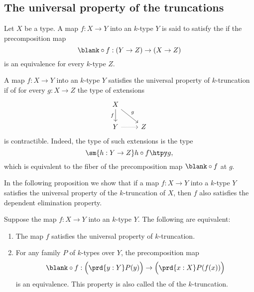 \subsection{The universal property of the truncations}

\begin{defn}\label{defn:is_truncation}
Let $X$ be a type. A map $f:X\to Y$ into an $k$-type $Y$ is said to satisfy the  if the precomposition map
\begin{equation*}
\blank\circ f: (Y\to Z)\to (X\to Z)
\end{equation*}
is an equivalence for every $k$-type $Z$.
\end{defn}

\begin{rmk}
A map $f:X\to Y$ into an $k$-type $Y$ satisfies the universal property of $k$-truncation if of for every $g:X\to Z$ the type of extensions
\begin{equation*}
\begin{tikzcd}
X \arrow[dr,"g"] \arrow[d,swap,"f"] \\
Y \arrow[r,densely dotted] & Z
\end{tikzcd}
\end{equation*}
is contractible. Indeed, the type of such extensions is the type
\begin{equation*}
\sm{h:Y\to Z} h\circ f\htpy g,
\end{equation*}
which is equivalent to the fiber of the precomposition map $\blank\circ f$ at $g$. 
\end{rmk}

In the following proposition we show that if a map $f:X\to Y$ into a $k$-type $Y$ satisfies the universal property of the $k$-truncation of $X$, then $f$ also satisfies the dependent elimination property.

\begin{prp}\label{thm:trunc_dup}
  Suppose the map $f:X\to Y$ into an $k$-type $Y$. The following are equivalent:
  \begin{enumerate}
  \item The map $f$ satisfies the universal property of $k$-truncation.
  \item For any family $P$ of $k$-types over $Y$, the precomposition map
    \begin{equation*}
      \blank\circ f : \Big(\prd{y:Y}P(y)\Big)\to \Big(\prd{x:X}P(f(x))\Big)
    \end{equation*}
    is an equivalence. This property is also called the  of the $k$-truncation.
  \end{enumerate}
\end{prp}

